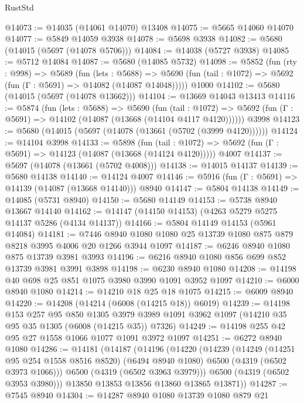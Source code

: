 \begin{lexlean}{RustStd}
\begin{coremodule}
@14073 := @14035 (@14061 @14070) @13408
@14075 := @5665 @14060 @14070
@14077 := @5849 @14059 @3938
@14078 := @5698 @3938
@14082 := @5680 (@14015 (@5697 (@14078 @5706)))
@14084 := @14038 (@5727 @3938)
@14085 := @5712 @14084
@14087 := @5680 (@14085 @5732)
@14098 := @5852
    (fun (rty : @998) =>
    @5689
      (fun (lets : @5688) =>
      @5690 (fun (tail : @1072) => @5692 (fun (Γ : @5691) => @14082 (@14087 @14048)))))
    @1000
@14102 := @5680 (@14015 (@5697 (@14078 @13662)))
@14104 := @13669 @14043 @13413
@14116 := @5874
    (fun (lets : @5688) =>
    @5690
      (fun (tail : @1072) =>
      @5692 (fun (Γ : @5691) => @14102 (@14087 (@13668 (@14104 @4117 @4120))))))
    @3998
@14123 := @5680 (@14015 (@5697 (@14078 (@13661 (@5702 (@3999 @4120))))))
@14124 := @14104 @3998
@14133 := @5898
    (fun (tail : @1072) => @5692 (fun (Γ : @5691) => @14123 (@14087 (@13668 (@14124 @4120)))))
    @4007
@14137 := @5697 (@14078 (@13661 (@5702 @4008)))
@14138 := @14015 @14137
@14139 := @5680 @14138
@14140 := @14124 @4007
@14146 := @5916 (fun (Γ : @5691) => @14139 (@14087 (@13668 @14140))) @8940
@14147 := @5804 @14138
@14149 := @14085 (@5731 @8940)
@14150 := @5680 @14149
@14153 := @5738 @8940 @13667 @14140
@14162 := @14147 (@14150 @14153) (@4263 @5279 @5275 @14137 @5286 (@4134 @14137))
@14166 := @5804 @14149 @14153 (@5961 @14084)
@14181 := @7446 @8940 @1080 @1080 @25 @13739 @1080 @875 @879 @8218 @3995 @4006 @20 @1266 @3944 @1097
@14187 := @6246 @8940 @1080 @875 @13739 @3981 @3993
@14196 := @6216 @8940 @1080 @856 @699 @852 @13739 @3981 @3991 @3898
@14198 := @6230 @8940 @1080
@14208 := @14198 @40 @698 @25 @851 @1075 @3980 @3990 @1091 @3952 @1097
@14210 := @6000 @8940 @1080
@14214 := @14210 @18 @25 @18 @1075
@14215 := @6009 @8940
@14220 := @14208 (@14214 (@6008 (@14215 @18)) @6019)
@14239 := @14198
    @153
    @257
    @95
    @850
    @1305
    @3979
    @3989
    @1091
    @3962
    @1097
    (@14210 @35 @95 @35 @1305 (@6008 (@14215 @35)) @7326)
@14249 := @14198 @255 @42 @95 @27 @1558 @1066 @1077 @1091 @3972 @1097
@14251 := @6272 @8940 @1080
@14286 := @14181
    (@14187
      (@14196
        (@14220
          (@14239
            (@14249
              (@14251 @95 @254 @1558 @8516 @8520)
              (@6494 @8940 @1080)
              @6500
              (@4319 (@6502 @3973 @1066)))
            @6500
            (@4319 (@6502 @3963 @3979)))
          @6500
          (@4319 (@6502 @3953 @3980)))
        @13850
        @13853
        @13856
        @13860
        @13865
        @13871))
@14287 := @7545 @8940
@14304 := @14287
    @8940
    @1080
    @13739
    @1080
    @879
    @21

\end{coremodule}
\end{lexlean}
